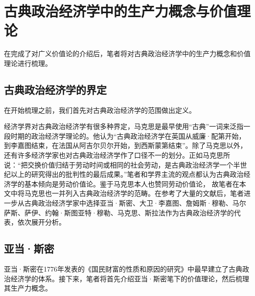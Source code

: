 
\chapter{古典政治经济学中的生产力概念与价值理论}

在完成了对广义价值论的介绍后，笔者将对古典政治经济学中的生产力概念和价值理论进行梳理。

\section{古典政治经济学的界定}

在开始梳理之前，我们首先对古典政治经济学的范围做出定义。

经济学界对古典政治经济学有很多种界定，马克思是最早使用“古典”一词来泛指一段时期的政治经济学理论的\cite[7]{YueHan*MeiNaDe*KaiEnSiJiuYeLiXiHeHuoBiTongLunChongYiBen2021}。他认为“古典政治经济学在英国从威廉·配第开始，到李嘉图结束，在法国从阿吉尔贝尔开始，到西斯蒙第结束”\cite[41]{ZhongGongZhongYangMaKeSiEnGeSiLieNingSiDaLinZhuZuoBianYiJuMaKeSiEnGeSiQuanJiDi13Juan1962}。除了马克思以外，还有许多经济学家也对古典政治经济学作了口径不一的划分\cite[5-8]{CaiJiMingCongGuDianZhengZhiJingJiXueDaoZhongGuoTeSeSheHuiZhuYiZhengZhiJingJiXueJiYuZhongGuoShiJiaoDeZhengZhiJingJiXueYanBianShangCe2023}。正如马克思所说：“把交换价值归结于劳动时间或相同的社会劳动，是古典政治经济学一个半世纪以上的研究得出的批判性的最后成果。”\cite[41]{ZhongGongZhongYangMaKeSiEnGeSiLieNingSiDaLinZhuZuoBianYiJuMaKeSiEnGeSiQuanJiDi13Juan1962}笔者和学界主流的观点\cite[45]{ChenDaiSunCongGuDianJingJiXuePaiDaoMaKeSiRuoGanZhuYaoXueShuoFaZhanLueLun2014}\cite[12]{CaiJiMingCongGuDianZhengZhiJingJiXueDaoZhongGuoTeSeSheHuiZhuYiZhengZhiJingJiXueJiYuZhongGuoShiJiaoDeZhengZhiJingJiXueYanBianShangCe2023}都认为古典政治经济学的基本倾向是劳动价值论。鉴于马克思本人也赞同劳动价值论，
故笔者在本文中将马克思也一并列入古典政治经济学的范畴。在参考了大量的文献后，笔者进一步从古典政治经济学家中选择亚当·斯密、大卫·李嘉图、詹姆斯·穆勒、马尔萨斯、萨伊、约翰·斯图亚特·穆勒、马克思、斯拉法作为古典政治经济学的代表，依次展开分析。

\section{亚当·斯密}
 
亚当·斯密在1776年发表的《国民财富的性质和原因的研究》中最早建立了古典政治经济学的体系\cite[120]{CaiJiMingCongGuDianZhengZhiJingJiXueDaoZhongGuoTeSeSheHuiZhuYiZhengZhiJingJiXueJiYuZhongGuoShiJiaoDeZhengZhiJingJiXueYanBianShangCe2023}\cite[90]{YanZhiJieXiFangJingJiXueShuoShiJiaoChengDiErBan2013}。接下来，笔者将首先介绍亚当·斯密笔下的价值理论，然后梳理其生产力概念。

